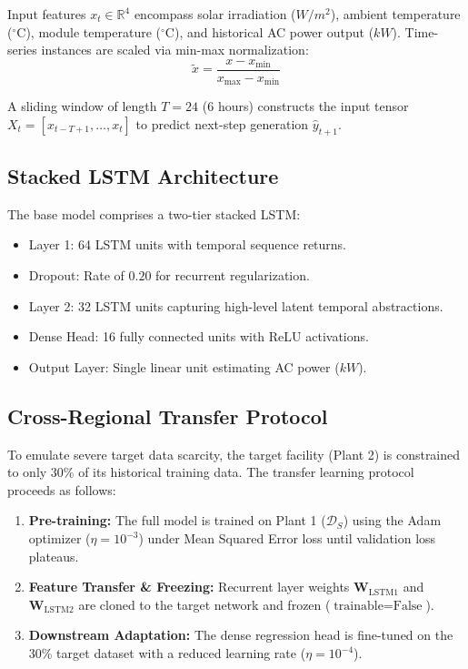 \documentclass[conference]{IEEEtran}
\begin{document}
Input features $x_t \in \mathbb{R}^4$ encompass solar irradiation ($W/m^2$), ambient temperature ($^\circ\text{C}$), module temperature ($^\circ\text{C}$), and historical AC power output ($kW$). Time-series instances are scaled via min-max normalization:
\begin{equation}
\tilde{x} = \frac{x - x_{\text{min}}}{x_{\text{max}} - x_{\text{min}}}
\end{equation}

A sliding window of length $T = 24$ (6 hours) constructs the input tensor $X_t = [x_{t-T+1}, \dots, x_t]$ to predict next-step generation $\hat{y}_{t+1}$.

\subsection{Stacked LSTM Architecture}
The base model comprises a two-tier stacked LSTM:
\begin{itemize}
    \item Layer 1: 64 LSTM units with temporal sequence returns.
    \item Dropout: Rate of $0.20$ for recurrent regularization.
    \item Layer 2: 32 LSTM units capturing high-level latent temporal abstractions.
    \item Dense Head: 16 fully connected units with ReLU activations.
    \item Output Layer: Single linear unit estimating AC power ($kW$).
\end{itemize}

\subsection{Cross-Regional Transfer Protocol}
To emulate severe target data scarcity, the target facility (Plant 2) is constrained to only 30\% of its historical training data. The transfer learning protocol proceeds as follows:
\begin{enumerate}
    \item \textbf{Pre-training:} The full model is trained on Plant 1 ($\mathcal{D}_S$) using the Adam optimizer ($\eta = 10^{-3}$) under Mean Squared Error loss until validation loss plateaus.
    \item \textbf{Feature Transfer \& Freezing:} Recurrent layer weights $\mathbf{W}_{\text{LSTM1}}$ and $\mathbf{W}_{\text{LSTM2}}$ are cloned to the target network and frozen ($\text{trainable} = \text{False}$).
    \item \textbf{Downstream Adaptation:} The dense regression head is fine-tuned on the 30\% target dataset with a reduced learning rate ($\eta = 10^{-4}$).
\end{enumerate}
\end{document}
